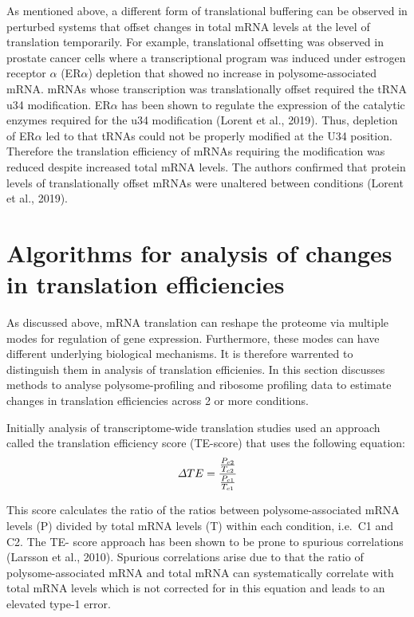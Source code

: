\documentclass[12pt,openany]{book}
\begin{document}
As mentioned above, a different form of translational buffering can be
observed in perturbed systems that offset changes in total mRNA levels
at the level of translation temporarily. For example, translational
offsetting was observed in prostate cancer cells where a transcriptional
program was induced under estrogen receptor \(\alpha\) (ER\(\alpha\))
depletion that showed no increase in polysome-associated mRNA. mRNAs
whose transcription was translationally offset required the tRNA u34
modification. ER\(\alpha\) has been shown to regulate the expression of
the catalytic enzymes required for the u34 modification (Lorent et al.,
2019). Thus, depletion of ER\(\alpha\) led to that tRNAs could not be
properly modified at the U34 position. Therefore the translation
efficiency of mRNAs requiring the modification was reduced despite
increased total mRNA levels. The authors confirmed that protein levels
of translationally offset mRNAs were unaltered between conditions
(Lorent et al., 2019). \newline
\section{Algorithms for analysis of changes in translation efficiencies}\label{algorithm}

As discussed above, mRNA translation can reshape the proteome via
multiple modes for regulation of gene expression. Furthermore, these
modes can have different underlying biological mechanisms. It is
therefore warrented to distinguish them in analysis of translation
efficienies. In this section discusses methods to analyse
polysome-profiling and ribosome profiling data to estimate changes in
translation efficiencies across 2 or more conditions.

Initially analysis of transcriptome-wide translation studies used an
approach called the translation efficiency score (TE-score) that uses
the following equation:
\[\varDelta TE = \frac{\frac{P_{c2}}{T_{c2}}} {\frac{P_{c1}}{T_{c1}}}\\\]

This score calculates the ratio of the ratios between
polysome-associated mRNA levels (P) divided by total mRNA levels (T)
within each condition, i.e.~C1 and C2. The TE- score approach has been
shown to be prone to spurious correlations (Larsson et al., 2010).
Spurious correlations arise due to that the ratio of polysome-associated
mRNA and total mRNA can systematically correlate with total mRNA levels
which is not corrected for in this equation and leads to an elevated
type-1 error.
\end{document}

